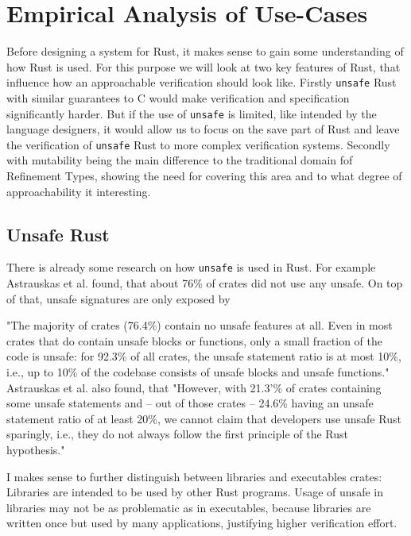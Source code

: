 \documentclass{book}
\newcommand{\code}[1]{\texttt{#1}}
\theoremstyle{definition}
\begin{document}
\chapter{Empirical Analysis of Use-Cases}

Before designing a system for Rust, it makes sense to gain some understanding of how Rust is used. For this purpose we will look at two key features of Rust, that influence how an approachable verification should look like.
Firstly \code{unsafe} Rust with similar guarantees to C would make verification and specification significantly harder. But if the use of \code{unsafe} is limited, like intended by the language designers, it would allow us to focus on the save part of Rust and leave the verification of \code{unsafe} Rust to more complex verification systems.
Secondly with mutability being the main difference to the traditional domain fof Refinement Types, showing the need for covering this area and to what degree of approachability it interesting.

\label{ss:unsafe-rust}\section{Unsafe Rust}

There is already some research on how \code{unsafe} is used in Rust. For example Astrauskas et al. \cite[]{astrauskas_how_2020} found, that about 76\% of crates did not use any unsafe. On top of that, unsafe signatures are only exposed by

"The majority of crates (76.4\%) contain no unsafe features at all. Even in most crates that do contain unsafe blocks or functions, only a small fraction of the code is unsafe: for 92.3\% of all crates, the unsafe statement ratio is at most 10\%, i.e., up to 10\% of the codebase consists of unsafe blocks and unsafe functions." \cite[p. 13]{astrauskas_how_2020}
Astrauskas et al. also found, that "However, with 21.3'\% of crates containing some unsafe statements and – out of those crates – 24.6\% having an unsafe statement ratio of at least 20\%, we cannot claim that developers use unsafe Rust sparingly, i.e., they do not always follow the first principle of the Rust hypothesis." \cite[p. 14]{astrauskas_how_2020}

I makes sense to further distinguish between libraries and executables crates: Libraries are intended to be used by other Rust programs. Usage of unsafe in libraries may not be as problematic as in executables, because libraries are written once but used by many applications, justifying higher verification effort.
\end{document}
